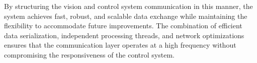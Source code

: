 By structuring the vision and control system communication in this manner, the system achieves fast, robust, and scalable data exchange while maintaining the flexibility to accommodate future improvements. The combination of efficient data serialization, independent processing threads, and network optimizations ensures that the communication layer operates at a high frequency without compromising the responsiveness of the control system. 


